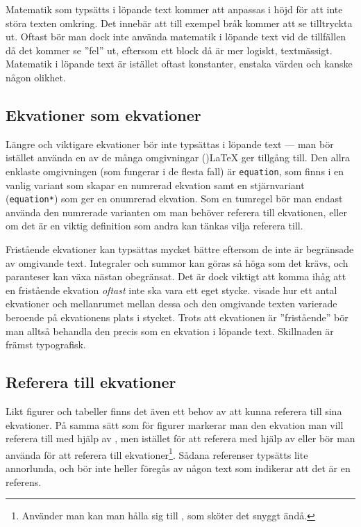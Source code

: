 \documentclass[10pt,../../a4.tex]{subfiles}
\begin{document}
Matematik som typsätts i löpande text kommer att anpassas i höjd för att
inte störa texten omkring. Det innebär att till exempel bråk kommer att
se tilltryckta ut. Oftast bör man dock inte använda matematik i löpande
text vid de tillfällen då det kommer se ”fel” ut, eftersom ett block då
är mer logiskt, textmässigt. Matematik i löpande text är istället oftast
konstanter, enstaka värden och kanske någon olikhet.

\subsection{Ekvationer som ekvationer}\label{sec:3:ekvsomekv}
Längre och viktigare ekvationer bör inte typsättas i löpande text —
man bör istället använda en av de många omgivningar (\AmS)\LaTeX{} ger
tillgång till. Den allra enklaste omgivningen (som fungerar i de flesta
fall) är \texttt{equation}, som finns i en vanlig variant som skapar 
en numrerad ekvation samt en stjärnvariant (\texttt{equation*}) som ger en
onumrerad ekvation. Som en tumregel bör man endast använda den numrerade
varianten om man behöver referera till ekvationen, eller om det är en
viktig definition som andra kan tänkas vilja referera till.

Fristående ekvationer kan typsättas mycket bättre eftersom de inte är 
begränsade av omgivande text. Integraler och summor kan göras så höga som
det krävs, och paranteser kan växa nästan obegränsat. Det är dock viktigt
att komma ihåg att en fristående ekvation \emph{oftast} inte ska vara ett 
eget
stycke.  visade hur ett antal ekvationer och
mellanrumet mellan dessa och den omgivande texten varierade beroende på
	ekvationens plats i stycket. Trots att ekvationen är ”fristående” bör
	man alltså behandla den precis som en
ekvation i löpande text. Skillnaden är främst typografisk.

\subsection{Referera till ekvationer}
Likt figurer och tabeller finns det även ett behov av att kunna referera
till sina ekvationer. På samma sätt som för figurer markerar man den
ekvation man vill referera till med hjälp av , men istället
för att referera med hjälp av  eller  bör man använda
 för att referera till ekvationer\footnote{Använder man
 kan man hålla sig till , som sköter det
snyggt ändå.}. Sådana referenser typsätts
lite annorlunda, och bör inte heller föregås av någon text som indikerar
att det är en referens.
\end{document}
